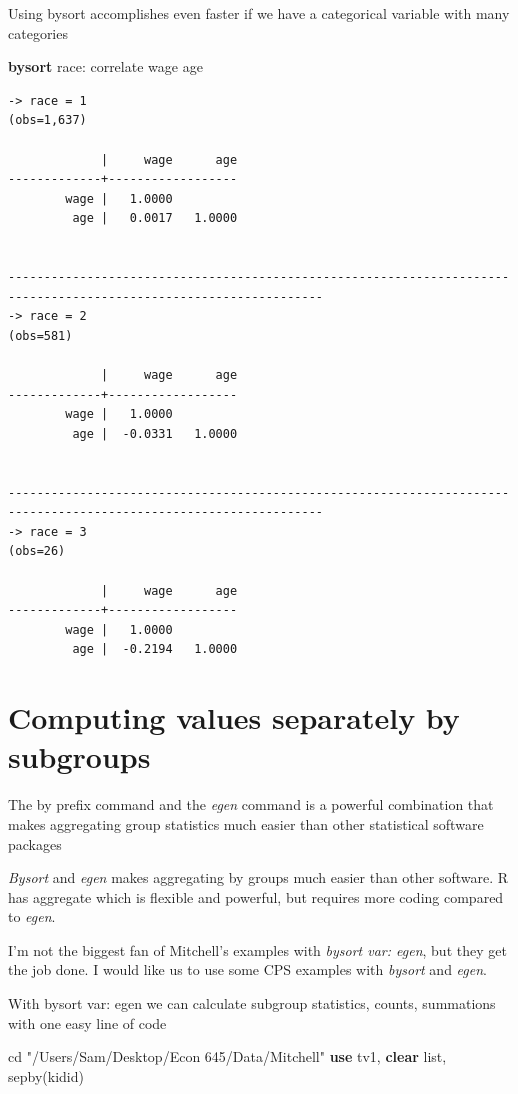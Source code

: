 \documentclass[
]{book}
\newenvironment{Shaded}{\begin{snugshade}}{\end{snugshade}}
\newcommand{\KeywordTok}[1]{\textcolor[rgb]{0.13,0.29,0.53}{\textbf{#1}}}
\newcommand{\NormalTok}[1]{#1}
\newcommand{\OtherTok}[1]{\textcolor[rgb]{0.56,0.35,0.01}{#1}}
\newcommand{\StringTok}[1]{\textcolor[rgb]{0.31,0.60,0.02}{#1}}
\begin{document}
Using bysort accomplishes even faster if we have a categorical variable with many categories

\begin{Shaded}
\begin{Highlighting}[]
\KeywordTok{bysort}\NormalTok{ race: correlate wage age}
\end{Highlighting}
\end{Shaded}

\begin{verbatim}
-> race = 1
(obs=1,637)

             |     wage      age
-------------+------------------
        wage |   1.0000
         age |   0.0017   1.0000


------------------------------------------------------------------------------------------------------------------
-> race = 2
(obs=581)

             |     wage      age
-------------+------------------
        wage |   1.0000
         age |  -0.0331   1.0000


------------------------------------------------------------------------------------------------------------------
-> race = 3
(obs=26)

             |     wage      age
-------------+------------------
        wage |   1.0000
         age |  -0.2194   1.0000
\end{verbatim}

\section{Computing values separately by subgroups}\label{computing-values-separately-by-subgroups}

The by prefix command and the \emph{egen} command is a powerful combination that
makes aggregating group statistics much easier than other statistical
software packages

\emph{Bysort} and \emph{egen} makes aggregating by groups much easier than other software. R has aggregate which is flexible and powerful, but requires more coding compared to \emph{egen}.

I'm not the biggest fan of Mitchell's examples with \emph{bysort var: egen}, but they get the job done. I would like us to use some CPS examples with \emph{bysort} and \emph{egen}.

With bysort var: egen we can calculate subgroup statistics, counts, summations
with one easy line of code

\begin{Shaded}
\begin{Highlighting}[]
\NormalTok{cd }\StringTok{"/Users/Sam/Desktop/Econ 645/Data/Mitchell"}
\KeywordTok{use}\NormalTok{ tv1, }\KeywordTok{clear}
\OtherTok{list}\NormalTok{, sepby(kidid)}
\end{Highlighting}
\end{Shaded}
\end{document}
